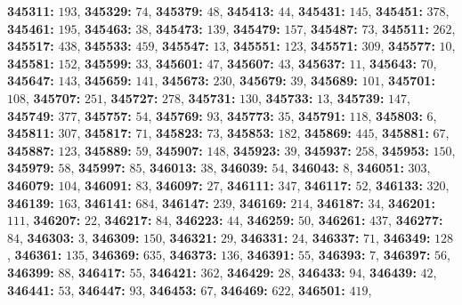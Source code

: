 \textsf{\bfseries 345311:} $193$, \textsf{\bfseries 345329:} $74$, \textsf{\bfseries 345379:} $48$, \textsf{\bfseries 345413:} $44$, \textsf{\bfseries 345431:} $145$, \textsf{\bfseries 345451:} $378$, \textsf{\bfseries 345461:} $195$, \textsf{\bfseries 345463:} $38$, \textsf{\bfseries 345473:} $139$, \textsf{\bfseries 345479:} $157$, \textsf{\bfseries 345487:} $73$, \textsf{\bfseries 345511:} $262$, \textsf{\bfseries 345517:} $438$, \textsf{\bfseries 345533:} $459$, \textsf{\bfseries 345547:} $13$, \textsf{\bfseries 345551:} $123$, \textsf{\bfseries 345571:} $309$, \textsf{\bfseries 345577:} $10$, \textsf{\bfseries 345581:} $152$, \textsf{\bfseries 345599:} $33$, \textsf{\bfseries 345601:} $47$, \textsf{\bfseries 345607:} $43$, \textsf{\bfseries 345637:} $11$, \textsf{\bfseries 345643:} $70$, \textsf{\bfseries 345647:} $143$, \textsf{\bfseries 345659:} $141$, \textsf{\bfseries 345673:} $230$, \textsf{\bfseries 345679:} $39$, \textsf{\bfseries 345689:} $101$, \textsf{\bfseries 345701:} $108$, \textsf{\bfseries 345707:} $251$, \textsf{\bfseries 345727:} $278$, \textsf{\bfseries 345731:} $130$, \textsf{\bfseries 345733:} $13$, \textsf{\bfseries 345739:} $147$, \textsf{\bfseries 345749:} $377$, \textsf{\bfseries 345757:} $54$, \textsf{\bfseries 345769:} $93$, \textsf{\bfseries 345773:} $35$, \textsf{\bfseries 345791:} $118$, \textsf{\bfseries 345803:} $6$, \textsf{\bfseries 345811:} $307$, \textsf{\bfseries 345817:} $71$, \textsf{\bfseries 345823:} $73$, \textsf{\bfseries 345853:} $182$, \textsf{\bfseries 345869:} $445$, \textsf{\bfseries 345881:} $67$, \textsf{\bfseries 345887:} $123$, \textsf{\bfseries 345889:} $59$, \textsf{\bfseries 345907:} $148$, \textsf{\bfseries 345923:} $39$, \textsf{\bfseries 345937:} $258$, \textsf{\bfseries 345953:} $150$, \textsf{\bfseries 345979:} $58$, \textsf{\bfseries 345997:} $85$, \textsf{\bfseries 346013:} $38$, \textsf{\bfseries 346039:} $54$, \textsf{\bfseries 346043:} $8$, \textsf{\bfseries 346051:} $303$, \textsf{\bfseries 346079:} $104$, \textsf{\bfseries 346091:} $83$, \textsf{\bfseries 346097:} $27$, \textsf{\bfseries 346111:} $347$, \textsf{\bfseries 346117:} $52$, \textsf{\bfseries 346133:} $320$, \textsf{\bfseries 346139:} $163$, \textsf{\bfseries 346141:} $684$, \textsf{\bfseries 346147:} $239$, \textsf{\bfseries 346169:} $214$, \textsf{\bfseries 346187:} $34$, \textsf{\bfseries 346201:} $111$, \textsf{\bfseries 346207:} $22$, \textsf{\bfseries 346217:} $84$, \textsf{\bfseries 346223:} $44$, \textsf{\bfseries 346259:} $50$, \textsf{\bfseries 346261:} $437$, \textsf{\bfseries 346277:} $84$, \textsf{\bfseries 346303:} $3$, \textsf{\bfseries 346309:} $150$, \textsf{\bfseries 346321:} $29$, \textsf{\bfseries 346331:} $24$, \textsf{\bfseries 346337:} $71$, \textsf{\bfseries 346349:} $128$, \textsf{\bfseries 346361:} $135$, \textsf{\bfseries 346369:} $635$, \textsf{\bfseries 346373:} $136$, \textsf{\bfseries 346391:} $55$, \textsf{\bfseries 346393:} $7$, \textsf{\bfseries 346397:} $56$, \textsf{\bfseries 346399:} $88$, \textsf{\bfseries 346417:} $55$, \textsf{\bfseries 346421:} $362$, \textsf{\bfseries 346429:} $28$, \textsf{\bfseries 346433:} $94$, \textsf{\bfseries 346439:} $42$, \textsf{\bfseries 346441:} $53$, \textsf{\bfseries 346447:} $93$, \textsf{\bfseries 346453:} $67$, \textsf{\bfseries 346469:} $622$, \textsf{\bfseries 346501:} $419$, 
